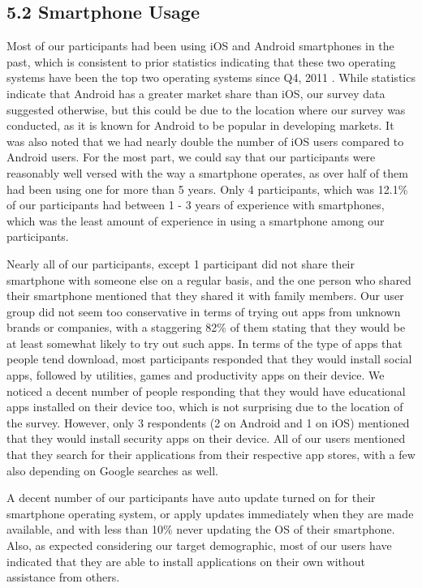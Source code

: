 \documentclass{sigchi}
\begin{document}
\subsection{5.2 Smartphone Usage}

Most of our participants had been using iOS and Android smartphones in the past, which is consistent to prior statistics indicating that these two operating systems have been the top two operating systems since Q4, 2011 \cite{statista_2016}. While statistics indicate that Android has a greater market share than iOS, our survey data suggested otherwise, but this could be due to the location where our survey was conducted, as it is known for Android to be popular in developing markets. It was also noted that we had nearly double the number of iOS users compared to Android users. For the most part, we could say that our participants were reasonably well versed with the way a smartphone operates, as over half of them had been using one for more than 5 years. Only 4 participants, which was 12.1\% of our participants had between 1 - 3 years of experience with smartphones, which was the least amount of experience in using a smartphone among our participants.

Nearly all of our participants, except 1 participant did not share their smartphone with someone else on a regular basis, and the one person who shared their smartphone mentioned that they shared it with family members. Our user group did not seem too conservative in terms of trying out apps from unknown brands or companies, with a staggering 82\% of them stating that they would be at least somewhat likely to try out such apps. In terms of the type of apps that people tend download, most participants responded that they would install social apps, followed by utilities, games and productivity apps on their device. We noticed a decent number of people responding that they would have educational apps installed on their device too, which is not surprising due to the location of the survey. However, only 3 respondents (2 on Android and 1 on iOS) mentioned that they would install security apps on their device. All of our users mentioned that they search for their applications from their respective app stores, with a few also depending on Google searches as well.

A decent number of our participants have auto update turned on for their smartphone operating system, or apply updates immediately when they are made available, and with less than 10\% never updating the OS of their smartphone. Also, as expected considering our target demographic, most of our users have indicated that they are able to install applications on their own without assistance from others.
\end{document}
